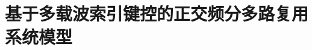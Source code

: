 \documentclass{standalone}
\begin{document}
\thesistranslationchinese
\section{基于多载波索引键控的正交频分多路复用系统模型}
\end{document}
